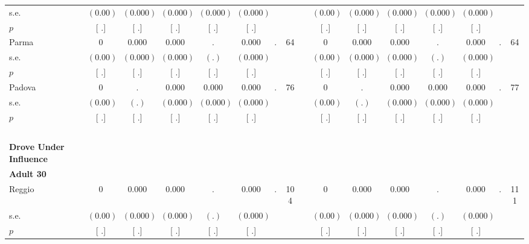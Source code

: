 \begin{longtable}{L{8em} c c c c c c c p{1em} c c c c c c c}
\quad \quad \quad \quad s.e.& $ (     0.00)$ & $ (    0.000)$ & $ (    0.000)$ & $ (    0.000)$ & $ (    0.000)$ & & & & $ (     0.00)$ & $ (    0.000)$ & $ (    0.000)$ & $ (    0.000)$ & $ (    0.000)$ & &  \\*
\quad \quad \quad \quad $ p$ & [        .] & [        .] & [        .] & [        .] & [        .] & & & & [        .] & [        .] & [        .] & [        .] & [        .] & &  \\[1em]
\quad \quad \quad Parma& 0 &     0.000 &     0.000 &         . &     0.000 &         . &        64 & & 0 &     0.000 &     0.000 &         . &     0.000 &         . &        64  \\*
\quad \quad \quad \quad s.e.& $ (     0.00)$ & $ (    0.000)$ & $ (    0.000)$ & $ (        .)$ & $ (    0.000)$ & & & & $ (     0.00)$ & $ (    0.000)$ & $ (    0.000)$ & $ (        .)$ & $ (    0.000)$ & &  \\*
\quad \quad \quad \quad $ p$ & [        .] & [        .] & [        .] & [        .] & [        .] & & & & [        .] & [        .] & [        .] & [        .] & [        .] & &  \\[1em]
\quad \quad \quad Padova& 0 &         . &     0.000 &     0.000 &     0.000 &         . &        76 & & 0 &         . &     0.000 &     0.000 &     0.000 &         . &        77  \\*
\quad \quad \quad \quad s.e.& $ (     0.00)$ & $ (        .)$ & $ (    0.000)$ & $ (    0.000)$ & $ (    0.000)$ & & & & $ (     0.00)$ & $ (        .)$ & $ (    0.000)$ & $ (    0.000)$ & $ (    0.000)$ & &  \\*
\quad \quad \quad \quad $ p$ & [        .] & [        .] & [        .] & [        .] & [        .] & & & & [        .] & [        .] & [        .] & [        .] & [        .] & &  \\[1em]
~\\[1em]
\textbf{Drove Under Influence} \\*
\quad \quad \textbf{Adult 30} & & & & & & & & & & & & & & & \\* 
\quad \quad \quad Reggio& 0 &     0.000 &     0.000 &         . &     0.000 &         . &       104 & & 0 &     0.000 &     0.000 &         . &     0.000 &         . &       111  \\*
\quad \quad \quad \quad s.e.& $ (     0.00)$ & $ (    0.000)$ & $ (    0.000)$ & $ (        .)$ & $ (    0.000)$ & & & & $ (     0.00)$ & $ (    0.000)$ & $ (    0.000)$ & $ (        .)$ & $ (    0.000)$ & &  \\*
\quad \quad \quad \quad $ p$ & [        .] & [        .] & [        .] & [        .] & [        .] & & & & [        .] & [        .] & [        .] & [        .] & [        .] & &  \\[1em]

\end{longtable}
